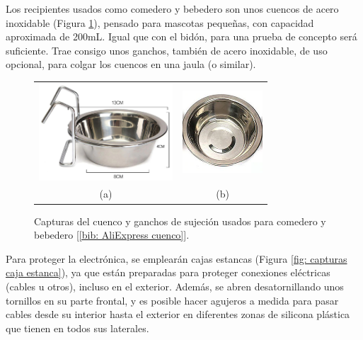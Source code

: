\documentclass[12pt]{article}
\begin{document}
	\pagebreak
	
	\noindent Los recipientes usados como comedero y bebedero son unos cuencos de acero inoxidable (Figura \ref{fig: capturas bebedero}), pensado para mascotas pequeñas, con capacidad aproximada de 200mL. Igual que con el bidón, para una prueba de concepto será suficiente. Trae consigo unos ganchos, también de acero inoxidable, de uso opcional, para colgar los cuencos en una jaula (o similar).\\
	
	\begin{figure}[h!]
		\begin{center}
			\begin{tabular}{cc}
				\includegraphics[width=50mm]{img/cuenco_1.png} &   \includegraphics[width=30mm]{img/cuenco_2.png} \\
				(a) & (b)  \\[6pt]
			\end{tabular}
			\caption{Capturas del cuenco y ganchos de sujeción usados para comedero y bebedero [\ref{bib: AliExpress cuenco}]. }
			\label{fig: capturas bebedero}
		\end{center}
	\end{figure}
	
	\noindent Para proteger la electrónica, se emplearán cajas estancas (Figura \ref{fig: capturas caja estanca}), ya que están preparadas para proteger conexiones eléctricas (cables u otros), incluso en el exterior. Además, se abren desatornillando unos tornillos en su parte frontal, y es posible hacer agujeros a medida  para pasar cables desde su interior hasta el exterior en diferentes zonas de silicona plástica que tienen en todos sus laterales. 
	
\end{document}
